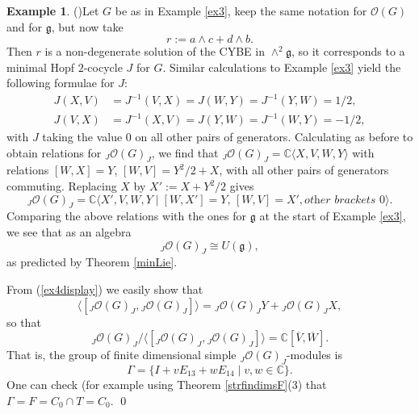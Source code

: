 \documentclass{amsart}
\numberwithin{equation}{section}
\theoremstyle{definition}
\newtheorem{example}[theorem]{Example}
\begin{document}
\begin{example}(\cite[Example 6.3]{G2})\label{ex4} Let $G$ be as in Example \ref{ex3}, keep the same notation for $\mathcal{O}(G)$ and for $\mathfrak{g}$, but now take 
$$ r:= a \wedge c + d \wedge b .$$ 
Then $r$ is a non-degenerate solution of the CYBE in $\wedge^2 \mathfrak{g}$, so it corresponds to a minimal Hopf $2$-cocycle $J$ for $G$. Similar calculations to Example \ref{ex3} yield the following formulae for $J$:
\begin{align*} J(X,V) &= J^{-1}(V,X) = J(W,Y) = J^{-1}(Y,W) = 1/2,\\
J(V,X) &= J^{-1}(X,V) = J(Y,W) = J^{-1}(W,Y) = -1/2,
\end{align*}
with $J$ taking the value 0 on all other pairs of generators. Calculating as before to obtain relations for $_J \mathcal{O}(G)_J$, we find that ${}_J \mathcal{O}(G)_J = \mathbb{C}\langle X,V,W,Y \rangle$ with relations $[W,X] = Y$, $[W,V] = Y^2/2 + X$, with all other pairs of generators commuting. Replacing $X$ by $X' := X + Y^2/2$ gives 
\begin{equation}\label{ex4display} {}_J \mathcal{O}(G)_J = \mathbb{C}\langle X',V,W,Y \mid [W,X'] = Y,\, [W,V] = X', \textit{other brackets }0 \rangle.
\end{equation}  
Comparing the above relations  with the ones for $\mathfrak{g}$ at the start of Example \ref{ex3}, we see that as an  algebra
$$ {}_J \mathcal{O}(G)_J \cong U(\mathfrak{g}),$$
as predicted by Theorem \ref{minLie}.

From (\ref{ex4display}) we easily show that 
$$\langle [{}_J\mathcal{O}(G)_J, {}_J\mathcal{O}(G)_J]\rangle = {}_J\mathcal{O}(G)_J Y + {}_J\mathcal{O}(G)_J X, $$
so that 
$$ {}_J\mathcal{O}(G)_J/\langle [{}_J\mathcal{O}(G)_J, {}_J\mathcal{O}(G)_J] \rangle =  \mathbb{C}[\overline{V}, \overline{W}]. $$
That is, the group of finite dimensional simple ${}_J\mathcal{O}(G)_J$-modules is
\begin{equation}\label{findimex4} \Gamma = \{ I + vE_{13} + wE_{14} \mid v,w \in \mathbb{C}\}.
\end{equation}
One can check (for example using Theorem \ref{strfindimsF}(3) that $\Gamma=F = C_0 \cap T = C_0$. \qed
\end{example}
\end{document}
